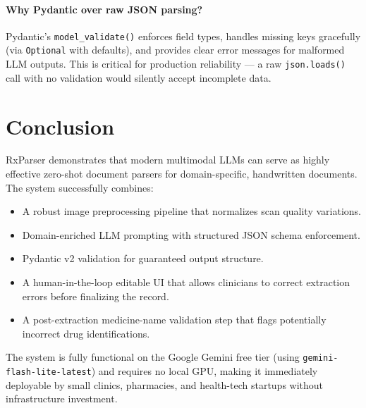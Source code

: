 \documentclass[12pt,a4paper]{article}
\begin{document}
\paragraph{Why Pydantic over raw JSON parsing?}
Pydantic's \texttt{model\_validate()} enforces field types, handles missing keys
gracefully (via \texttt{Optional} with defaults), and provides clear error messages
for malformed LLM outputs. This is critical for production reliability — a raw
\texttt{json.loads()} call with no validation would silently accept incomplete data.

\section{Conclusion}

RxParser demonstrates that modern multimodal LLMs can serve as highly effective
zero-shot document parsers for domain-specific, handwritten documents. The system
successfully combines:

\begin{itemize}[noitemsep]
    \item A robust image preprocessing pipeline that normalizes scan quality variations.
    \item Domain-enriched LLM prompting with structured JSON schema enforcement.
    \item Pydantic v2 validation for guaranteed output structure.
    \item A human-in-the-loop editable UI that allows clinicians to correct
          extraction errors before finalizing the record.
    \item A post-extraction medicine-name validation step that flags potentially
          incorrect drug identifications.
\end{itemize}

The system is fully functional on the Google Gemini free tier (using
\texttt{gemini-flash-lite-latest}) and requires no local GPU, making it immediately
deployable by small clinics, pharmacies, and health-tech startups without
infrastructure investment.
\end{document}
